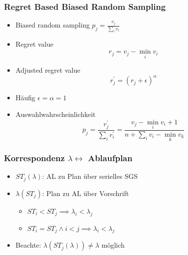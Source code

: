 \begin{frame}[noframenumbering]
	\frametitle{Regret Based Biased Random Sampling}
	
	\begin{itemize}
		\item Biased random sampling $ p_j = \frac{v_j}{\sum_i v_i} $ \\[5mm]
		\item Regret value \[r_j = v_j - \min_i v_i\]
		\item Adjusted regret value \[ r_j^\prime = (r_j + \epsilon)^\alpha \]
		\item Häufig $\epsilon = \alpha = 1$
		\item Auswahlwahrscheinlichkeit \[p_j = \frac{r_j^\prime}{\sum_i r_i^\prime} = \frac{v_j - \min_i v_i + 1}{n + \sum_i v_i - \min_k v_k}\]
	\end{itemize}
\end{frame}

\begin{frame}[noframenumbering]
	\frametitle{Korrespondenz $\lambda \leftrightarrow $ Ablaufplan}
	\begin{itemize}
		\item $ST_j(\lambda)$: AL zu Plan über serielles SGS\\[6mm]
		\item $\lambda(ST_j)$: Plan zu AL über Vorschrift
		\begin{itemize}
			\item $ST_i < ST_j \implies \lambda_i < \lambda_j$
			\item $ST_i=ST_j \land i < j \implies \lambda_i < \lambda_j$\\[6mm]
		\end{itemize}
		\item Beachte: $\lambda(ST_j(\lambda)) \neq \lambda$ möglich
	\end{itemize}
\end{frame}

